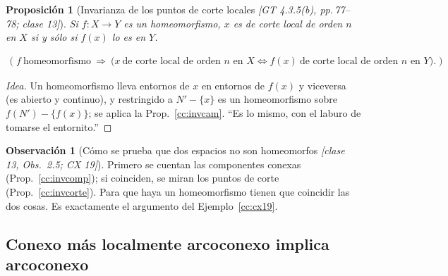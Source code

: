 \documentclass[11pt,a4paper]{article}
\newcommand{\lgc}[1]{\par\vspace{-3pt}\begin{gather*}\big(\;#1\;\big)\end{gather*}\vspace{-6pt}}
\newcommand{\figtit}[1]{\par\vspace{2pt}{\footnotesize\itshape #1}\par}
\theoremstyle{definition}
\newtheorem{observacion}[definicion]{Observación}
\theoremstyle{plain}
\newtheorem{proposicion}[definicion]{Proposición}
\newcommand{\fnt}[1]{{\normalfont\small\itshape\color{gray!150!black}[#1]}}
\begin{document}
\begin{figure}[ht]
\centering
{}
\figtit{Figura 27. GT Ej.\ 4.3.4. Órdenes de corte locales: $x$ tiene $2$, $y$ tiene $3$, $z$ tiene $4$. Un entorno chico de $z$ (círculo rayado) menos $z$ se parte en $4$ trocitos de segmento; ninguno de los tres puntos es de corte global.}
\end{figure}

\begin{proposicion}[Invarianza de los puntos de corte locales \fnt{GT 4.3.5(b), pp.\,77--78; clase 13}]
Si $f:X\to Y$ es un homeomorfismo, $x$ es de corte local de orden $n$ en $X$ si y sólo si $f(x)$ lo es en $Y$.
\lgc{f\ \text{homeomorfismo}\ \Rightarrow\ \big(x\ \text{de corte local de orden } n \text{ en } X\iff f(x)\ \text{de corte local de orden } n \text{ en } Y\big).}
\end{proposicion}

\begin{proof}[Idea]
Un homeomorfismo lleva entornos de $x$ en entornos de $f(x)$ y viceversa (es abierto y continuo), y restringido a $N'-\{x\}$ es un homeomorfismo sobre $f(N')-\{f(x)\}$; se aplica la Prop.~\ref{cc:invcam}. ``Es lo mismo, con el laburo de tomarse el entornito.''
\end{proof}

\begin{observacion}[Cómo se prueba que dos espacios no son homeomorfos \fnt{clase 13, Obs.\ 2.5; CX 19}]
Primero se cuentan las componentes conexas (Prop.~\ref{cc:invcomp}); si coinciden, se miran los puntos de corte (Prop.~\ref{cc:invcorte}). Para que haya un homeomorfismo tienen que coincidir las dos cosas. Es exactamente el argumento del Ejemplo~\ref{cc:cx19}.
\end{observacion}

\subsection{Conexo más localmente arcoconexo implica arcoconexo}\label{cc:conexarco}
\end{document}
